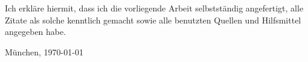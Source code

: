 \documentclass[11pt,a4paper,twoside]{article}
\begin{document}
    \noindent Ich erkl\"are hiermit, dass ich die vorliegende Arbeit
    selbstst\"andig angefertigt, alle Zitate als solche kenntlich gemacht
    sowie alle benutzten Quellen und Hilfsmittel angegeben habe.

    \bigskip\noindent M\"unchen, \today

    \vspace{4ex}\noindent\makebox[7cm]{\dotfill}


\cleardoublepage

    \pagestyle{fancy}
    \setcounter{page}{1}

\tableofcontents


\cleardoublepage

\setcounter{page}{1}
\fancyhead[LE,RO]{\rightmark}
\fancyhead[LO,RE]{\leftmark}
\fancyfoot[LE,RO]{\thepage}




    
    


\cleardoublepage %

    

    


\cleardoublepage

    



    \clearpage
    
    \label{sec:implementation:modeling}

    


\cleardoublepage

    
\end{document}

